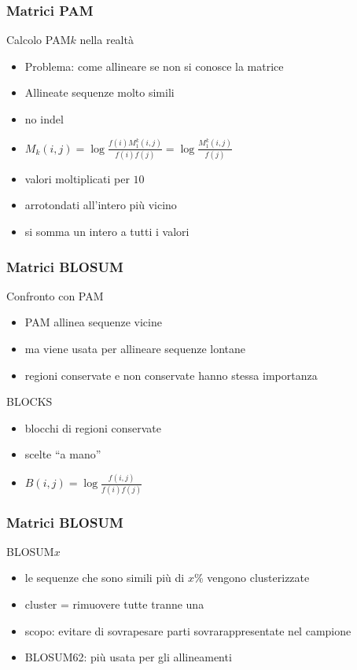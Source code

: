 \begin{frame}[fragile]
\frametitle{Matrici PAM}
\begin{block}{Calcolo PAM$k$ nella realtà}
\begin{itemize}
\item
Problema: come allineare se non si conosce la matrice
\item
Allineate sequenze molto simili
\item
no indel
\item
$M_{k}(i,j)=\log\frac{f(i)M_{1}^{k}(i,j)}{f(i)f(j)}=\log\frac{M_{1}^{k}(i,j)}{f(j)}$
\item
valori moltiplicati per $10$
\item
arrotondati all'intero più vicino
\item
si somma un intero a tutti i valori
\end{itemize}
\end{block}
\end{frame}


\begin{frame}[fragile]
\frametitle{Matrici BLOSUM}
\begin{block}{Confronto con PAM}
\begin{itemize}
\item
PAM allinea sequenze vicine
\item
ma viene usata per allineare sequenze lontane
\item
regioni conservate e non conservate hanno stessa importanza
\end{itemize}
\end{block}

\begin{block}{BLOCKS}
\begin{itemize}
\item
blocchi di regioni conservate
\item
scelte ``a mano''
\item
$B(i,j)=\log\frac{f(i,j)}{f(i)f(j)}$
\end{itemize}
\end{block}
\end{frame}

\begin{frame}[fragile]
\frametitle{Matrici BLOSUM}
\begin{block}{BLOSUM$x$}
\begin{itemize}
\item
le sequenze che sono simili più di $x$\% vengono clusterizzate
\item
cluster = rimuovere tutte tranne una
\item
scopo:  evitare di sovrapesare parti sovrarappresentate nel campione
\item
BLOSUM62: più usata per gli allineamenti
\end{itemize}
\end{block}
\end{frame}


